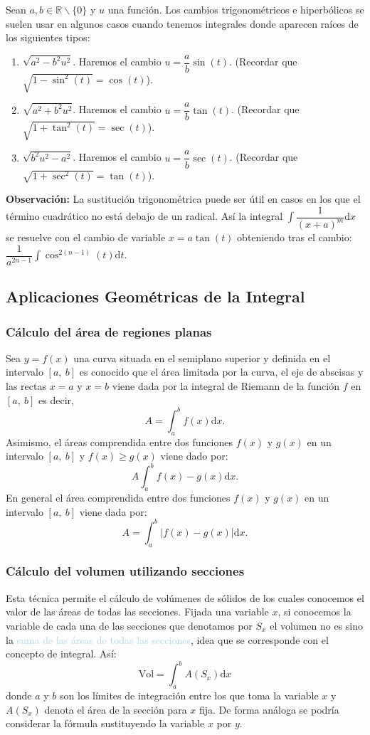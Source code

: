 Sean $a,b\in\mathbb{R}\backslash\{0\}$ y $u$ una función. Los cambios trigonométricos e hiperbólicos se suelen usar en algunos casos cuando tenemos integrales donde aparecen raíces de los siguientes tipos:
\begin{enumerate}[label=\arabic*)]
	\item $\sqrt{a^2-b^2u^2}$. Haremos el cambio $u=\dfrac{a}{b}\sin(t)$. (Recordar que $\sqrt{1-\sin^2(t)}=\cos(t)$).
	\item $\sqrt{a^2+b^2u^2}$. Haremos el cambio $u=\dfrac{a}{b}\tan(t)$. (Recordar que $\sqrt{1+\tan^2(t)}=\sec(t)$).
	\item $\sqrt{b^2u^2-a^2}$. Haremos el cambio $u=\dfrac{a}{b}\sec(t)$. (Recordar que $\sqrt{1+\sec^2(t)}=\tan(t)$).
\end{enumerate}
\textbf{Observación:} La sustitución trigonométrica puede ser útil en casos en los que el término cuadrático no está debajo de un radical. Así la integral $\int\dfrac{1}{(x+a)^m}\mathrm{d}x$ se resuelve con el cambio de variable $x=a\tan(t)$ obteniendo tras el cambio: $\dfrac{1}{a^{2n-1}}\int\cos^{2(n-1)}(t)\mathrm{d}t$.
\subsection{Aplicaciones Geométricas de la Integral}
\subsubsection{Cálculo del área de regiones planas}
Sea $y=f(x)$ una curva situada en el semiplano superior y definida en el intervalo $[a,~b]$ es conocido que el área limitada por la curva, el eje de abscisas y las rectas $x=a$ y $x=b$ viene dada por la integral de Riemann de la función $f$ en $[a,~b]$ es decir, \[A=\int_a^bf(x)\mathrm{d}x.\] Asimismo, el áreas comprendida entre dos funciones $f(x)$ y $g(x)$ en un intervalo $[a,~b]$ y $f(x)\ge g(x)$ viene dado por: \[A\int_a^bf(x)-g(x)\mathrm{d}x.\]En general el área comprendida entre dos funciones $f(x)$ y $g(x)$ en un intervalo $[a,~b]$ viene dada por: \[A=\int_a^b|f(x)-g(x)|\mathrm{d}x.\]
\subsubsection{Cálculo del volumen utilizando secciones}
Esta técnica permite el cálculo de volúmenes de sólidos de los cuales conocemos el valor de las áreas de todas las secciones. Fijada una variable $x$, si conocemos la variable de cada una de las secciones que denotamos por $S_x$ el volumen no es sino la \textcolor{lightblue}{suma de las áreas de todas las secciones}, idea que se corresponde con el concepto de integral. Así: \[\mathrm{Vol}=\int_a^bA(S_x)\mathrm{d}x\] donde $a$  y $b$ son los límites de integración entre los que toma la variable $x$ y $A(S_x)$ denota el área de la sección para $x$ fija. De forma análoga se podría considerar la fórmula sustituyendo la variable $x$ por $y$.
